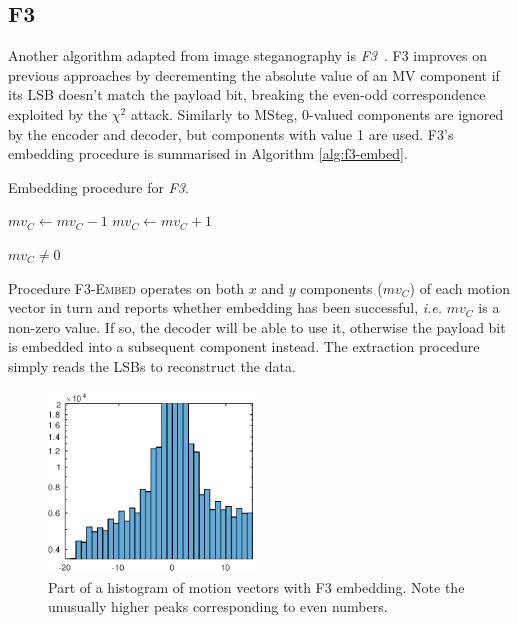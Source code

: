 \documentclass[12pt,british,twoside,notitlepage,usenames,dvipsnames,hypens,final]{report}
\numberwithin{equation}{section}
\numberwithin{figure}{section}
\begin{document}
\subsection{F3}

Another algorithm adapted from image steganography is \emph{F3}~\cite{f5}. F3 improves on previous approaches by decrementing the absolute value of an MV component if its LSB doesn't match the payload bit, breaking the even-odd correspondence exploited by the $\chi^2$ attack. Similarly to MSteg, 0-valued components are ignored by the encoder and decoder, but components with value 1 are used. F3's embedding procedure is summarised in Algorithm \ref{alg:f3-embed}.  

\begin{algorithm}[!htp]
\caption{Embedding procedure for \emph{F3}.}
\label{alg:f3-embed}
\begin{algorithmic}
\Else
        	\State $mv_C \gets mv_C - 1$
        \Else
        \State $mv_C \gets mv_C + 1$
        \EndIf
    \EndIf
    
    \State \Return $mv_C \neq 0$
\EndIf
\EndProcedure
\end{algorithmic}
\end{algorithm}

Procedure \textsc{F3-Embed} operates on both $x$ and $y$ components ($mv_C$) of each motion vector in turn and reports whether embedding has been successful, \emph{i.e.} $mv_C$ is a non-zero value. If so, the decoder will be able to use it, otherwise the payload bit is embedded into a subsequent component instead. The extraction procedure simply reads the LSBs to reconstruct the data.

\begin{figure}
\centering
\includegraphics[width=5.5cm]{img/f3-hist.eps}
\caption{Part of a histogram of motion vectors with F3 embedding. Note the unusually higher peaks corresponding to even numbers.}
\label{fig:f3-hist}
\end{figure}
\end{document}
